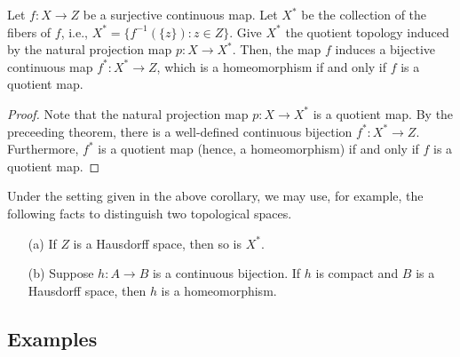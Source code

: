 \begin{cor}
    Let $f: X\rightarrow Z$ be a surjective continuous map.
    Let $X^*$ be the collection of the fibers of $f$, i.e., $X^*=\{f^{-1}(\{z\}): z\in Z\}$.
    Give $X^*$ the quotient topology induced by the natural projection map $p: X\rightarrow X^*$.
    Then, the map $f$ induces a bijective continuous map $f^*: X^*\rightarrow Z$, which is a homeomorphism if and only if $f$ is a quotient map.
\end{cor}
\begin{proof}
    Note that the natural projection map $p: X\rightarrow X^*$ is a quotient map.
    By the preceeding theorem, there is a well-defined continuous bijection $f^*: X^*\rightarrow Z$.
    Furthermore, $f^*$ is a quotient map (hence, a homeomorphism) if and only if $f$ is a quotient map.
\end{proof}
\begin{rmk}
    Under the setting given in the above corollary, we may use, for example, the following facts to distinguish two topological spaces.
    \begin{enumerate}
        \item[(a)]
        {
            If $Z$ is a Hausdorff space, then so is $X^*$.
        }
        \item[(b)]
        {
            Suppose $h: A\rightarrow B$ is a continuous bijection.
            If $h$ is compact and $B$ is a Hausdorff space, then $h$ is a homeomorphism.
        }
    \end{enumerate}
\end{rmk}

\subsection{Examples}

